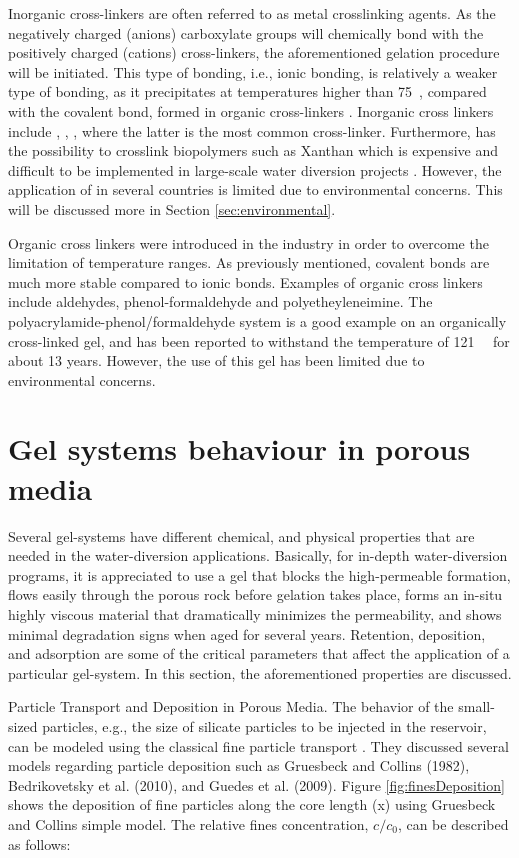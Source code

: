 Inorganic cross-linkers are often referred to as metal crosslinking agents. As the negatively charged (anions) carboxylate groups will chemically bond with the positively charged (cations) cross-linkers, the aforementioned gelation procedure will be initiated. This type of bonding, i.e., ionic bonding, is relatively a weaker type of bonding, as it precipitates at temperatures higher than 75~\celsius, compared with the covalent bond, formed in organic cross-linkers \citep{Al-Muntasheri2005}. Inorganic cross linkers include , , , where the latter is the most common cross-linker. Furthermore,  has the possibility to crosslink biopolymers such as Xanthan which is expensive and difficult to be implemented in large-scale water diversion projects \citep{Al-Muntasheri2012}. However, the application of  in several countries is limited due to environmental concerns. This will be discussed more in Section \ref{sec:environmental}.

Organic cross linkers were introduced in the industry in order to overcome the limitation of temperature ranges\citep{Al-Muntasheri2005}. As previously mentioned, covalent bonds are much more stable compared to ionic bonds. Examples of organic cross linkers include aldehydes, phenol-formaldehyde and polyetheyleneimine. The polyacrylamide-phenol/formaldehyde system is a good example on an organically cross-linked gel, and has been reported to withstand the temperature of 121~\celsius~ for about 13 years. However, the use of this gel has been limited due to environmental concerns.

\section{Gel systems behaviour in porous media}

Several gel-systems have different chemical, and physical properties that are needed in the water-diversion applications. Basically, for in-depth water-diversion programs, it is appreciated to use a gel that blocks the high-permeable formation, flows easily through the porous rock before gelation takes place, forms an in-situ highly viscous material that dramatically minimizes the permeability, and shows minimal degradation signs when aged for several years. Retention, deposition, and adsorption are some of the critical parameters that affect the application of a particular gel-system. In this section, the aforementioned properties are discussed.

Particle Transport and Deposition in Porous Media. The behavior of the small-sized particles, e.g., the size of silicate particles to be injected in the reservoir, can be modeled using the classical fine particle transport \citep{Stavland2011}. They discussed several models regarding particle deposition such as Gruesbeck and Collins (1982), Bedrikovetsky et al. (2010), and Guedes et al. (2009). Figure \ref{fig:finesDeposition} shows the deposition of fine particles along the core length (x) using Gruesbeck and Collins simple model. The relative fines concentration, $c/c_0$, can be described as follows:

